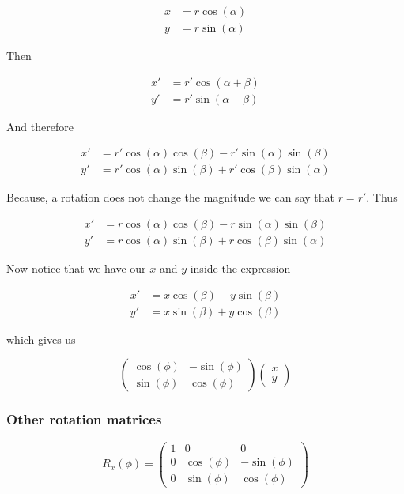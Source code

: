 \begin{align*}
    x &= r \cos(\alpha)\\
    y &= r \sin(\alpha)
\end{align*}

Then 

\begin{align*}
    x' &= r' \cos(\alpha + \beta)\\
    y' &= r' \sin(\alpha + \beta)
\end{align*}

And therefore

\begin{align*}
    x' &= r' \cos(\alpha)\cos(\beta) - r'\sin(\alpha)\sin(\beta)\\
    y' &= r' \cos(\alpha)\sin(\beta) + r'\cos(\beta)\sin(\alpha)
\end{align*}

Because, a rotation does not change the magnitude we can say that \(r = r'\). Thus 

\begin{align*}
    x' &= r \cos(\alpha)\cos(\beta) - r\sin(\alpha)\sin(\beta)\\
    y' &= r \cos(\alpha)\sin(\beta) + r\cos(\beta)\sin(\alpha)
\end{align*}

Now notice that we have our \(x\) and \(y\) inside the expression

\begin{align*}
    x' &= x\cos(\beta) - y\sin(\beta)\\
    y' &= x\sin(\beta) + y\cos(\beta)
\end{align*}

which gives us 

\[
\begin{pmatrix}
    \cos(\phi) & -\sin(\phi)\\
    \sin(\phi) & \cos(\phi)
\end{pmatrix}
\begin{pmatrix}
    x\\
    y
\end{pmatrix}
\]

\QED

\subsubsection{Other rotation matrices}

\[
R_x (\phi) =
\begin{pmatrix}
    1 & 0 & 0 \\
    0 & \cos(\phi) & -\sin(\phi) \\
    0 & \sin(\phi) & \cos(\phi)
\end{pmatrix}
\]

